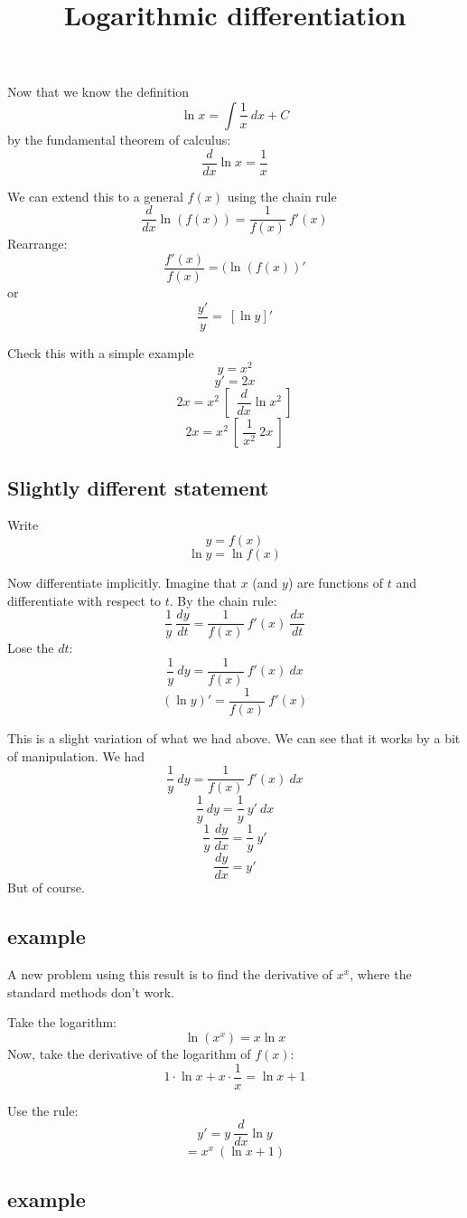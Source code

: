 \documentclass[11pt, oneside]{article}
\title{Logarithmic differentiation}
\date{}
\begin{document}
\maketitle
\Large

Now that we know the definition
\[ \ln x = \int \frac{1}{x} \ dx + C \]
by the fundamental theorem of calculus:
\[ \frac{d}{dx} \ln x = \frac{1}{x} \]

We can extend this to a general $f(x)$ using the chain rule
\[ \frac{d}{dx} \ln (f(x)) = \frac{1}{f(x)} \ f'(x) \]
Rearrange:
\[ \frac{f'(x)}{f(x)} = (\ln (f(x))' \]
or
\[ \frac{y'}{y} =  \ [ \ln y ]' \]

Check this with a simple example
\[ y = x^2 \]
\[ y' = 2x \]
\[ 2x = x^2 \ [ \ \ \frac{d}{dx} \ln x^2 \ ] \]
\[ 2x = x^2 \ [ \  \frac{1}{x^2} \ 2x \ ] \]

\subsection*{Slightly different statement}
Write
\[ y = f(x) \]
\[ \ln y = \ln f(x) \]

Now differentiate implicitly.  Imagine that $x$ (and $y$) are functions of $t$ and differentiate with respect to $t$.  By the chain rule:
\[ \frac{1}{y} \ \frac{dy}{dt} = \frac{1}{f(x)} \ f'(x) \ \frac{dx}{dt} \]
Lose the $dt$:
\[ \frac{1}{y} \ dy = \frac{1}{f(x)} \ f'(x) \ dx \]
\[ (\ln y)' = \frac{1}{f(x)} \ f'(x) \]

This is a slight variation of what we had above.  We can see that it works by a bit of manipulation.  We had
\[ \frac{1}{y} \ dy = \frac{1}{f(x)} \ f'(x) \ dx \]
\[ \frac{1}{y} \ dy = \frac{1}{y} \ y' \ dx \]
\[ \frac{1}{y} \ \frac{dy}{dx} = \frac{1}{y} \ y'  \]
\[ \frac{dy}{dx} = y'  \]
But of course.

\subsection*{example}

A new problem using this result is to find the derivative of $x^x$, where the standard methods don't work.  

Take the logarithm:
\[ \ln (x^x) = x \ln x \]
Now, take the derivative of the logarithm of $f(x)$:
\[ 1 \cdot \ln x + x \cdot \frac{1}{x} = \ln x + 1 \]

Use the rule:
\[ y' = y  \ \frac{d}{dx} \ln y \]
\[ = x^x \  (\ln x + 1) \]

\subsection*{example}
\end{document}

